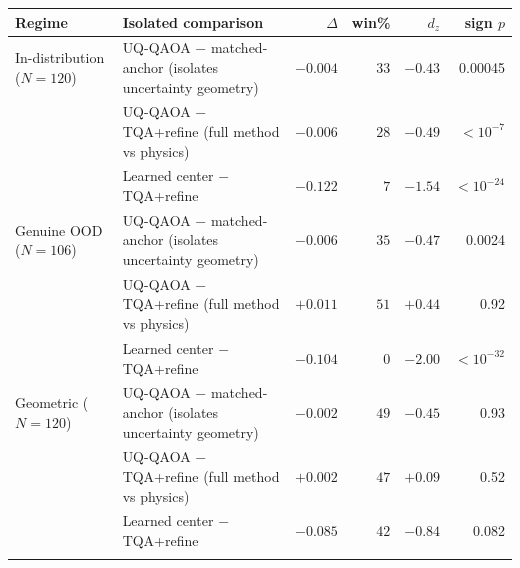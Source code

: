 \begin{tabular}{@{}llrrrr@{}}
\toprule
Regime & Isolated comparison & $\Delta$ & win\% & $d_z$ & sign $p$ \\
\midrule
In-distribution ($N{=}120$) & UQ-QAOA $-$ matched-anchor (isolates uncertainty geometry) & $-0.004$ & $33$ & $-0.43$ & 0.00045 \\
 & UQ-QAOA $-$ TQA+refine (full method vs physics) & $-0.006$ & $28$ & $-0.49$ & $<10^{-7}$ \\
 & Learned center $-$ TQA+refine & $-0.122$ & $7$ & $-1.54$ & $<10^{-24}$ \\
\addlinespace
Genuine OOD ($N{=}106$) & UQ-QAOA $-$ matched-anchor (isolates uncertainty geometry) & $-0.006$ & $35$ & $-0.47$ & 0.0024 \\
 & UQ-QAOA $-$ TQA+refine (full method vs physics) & $+0.011$ & $51$ & $+0.44$ & 0.92 \\
 & Learned center $-$ TQA+refine & $-0.104$ & $0$ & $-2.00$ & $<10^{-32}$ \\
\addlinespace
Geometric ($N{=}120$) & UQ-QAOA $-$ matched-anchor (isolates uncertainty geometry) & $-0.002$ & $49$ & $-0.45$ & 0.93 \\
 & UQ-QAOA $-$ TQA+refine (full method vs physics) & $+0.002$ & $47$ & $+0.09$ & 0.52 \\
 & Learned center $-$ TQA+refine & $-0.085$ & $42$ & $-0.84$ & 0.082 \\
\addlinespace
\bottomrule
\end{tabular}
